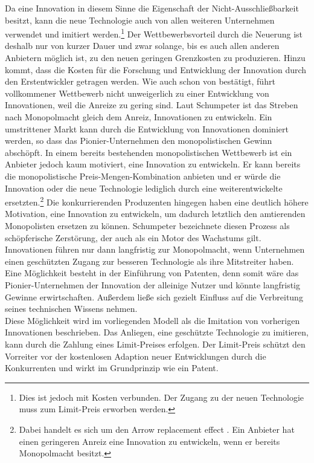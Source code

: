 %
Da eine Innovation in diesem Sinne die Eigenschaft der Nicht-Ausschließbarkeit besitzt, kann die neue Technologie auch von allen weiteren Unternehmen verwendet und imitiert werden.\footnote{Dies ist jedoch mit Kosten verbunden. Der Zugang zu der neuen Technologie muss zum Limit-Preis erworben werden.} Der Wettbewerbsvorteil durch die Neuerung ist deshalb nur von kurzer Dauer und zwar solange, bis es auch allen anderen Anbietern möglich ist, zu den neuen geringen Grenzkosten zu produzieren. Hinzu kommt, dass die Kosten für die Forschung und Entwicklung der Innovation durch den Erstentwickler getragen werden. Wie auch schon von \cite{Schumpeter.1934} bestätigt, führt vollkommener Wettbewerb nicht unweigerlich zu einer Entwicklung von Innovationen, weil die Anreize zu gering sind. Laut Schumpeter ist das Streben nach Monopolmacht gleich dem Anreiz, Innovationen zu entwickeln. Ein umstrittener Markt kann durch die Entwicklung von Innovationen dominiert werden, so dass das Pionier-Unternehmen den monopolistischen Gewinn abschöpft.  In einem bereits bestehenden monopolistischen Wettbewerb ist ein Anbieter jedoch kaum motiviert, eine Innovation zu entwickeln. Er kann bereits die monopolistische Preis-Mengen-Kombination anbieten und er würde die Innovation oder die neue Technologie lediglich durch eine weiterentwickelte ersetzten.\footnote{Dabei handelt es sich um den Arrow replacement effect \cite{Arrow.1962}. Ein Anbieter hat einen geringeren Anreiz eine Innovation zu entwickeln, wenn er bereits Monopolmacht besitzt.} Die konkurrierenden Produzenten hingegen haben eine deutlich höhere Motivation, eine Innovation zu entwickeln, um dadurch letztlich den amtierenden Monopolisten ersetzen zu können. Schumpeter bezeichnete diesen Prozess als schöpferische Zerstörung, der auch als ein Motor des Wachstums gilt.\\
%
Innovationen führen nur dann langfristig zur Monopolmacht, wenn Unternehmen einen geschützten Zugang zur besseren Technologie als ihre Mitstreiter haben. Eine Möglichkeit besteht in der Einführung von Patenten, denn somit wäre das Pionier-Unternehmen der Innovation der alleinige Nutzer und könnte langfristig Gewinne erwirtschaften. Außerdem ließe sich gezielt Einfluss auf die Verbreitung seines technischen Wissens nehmen. \\
%
Diese Möglichkeit wird im vorliegenden Modell als die Imitation von vorherigen Innovationen beschrieben. Das Anliegen, eine geschützte Technologie zu imitieren, kann durch die Zahlung eines Limit-Preises erfolgen. Der Limit-Preis schützt den Vorreiter vor der kostenlosen Adaption neuer Entwicklungen durch die Konkurrenten und wirkt im Grundprinzip wie ein Patent.
